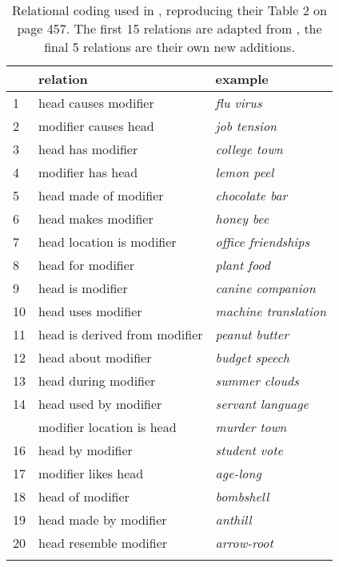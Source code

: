 \begin{table}[!htb]
  \centering
\begin{tabular}{lll}\lsptoprule
&relation&example\\\midrule
1&head causes modifier&\emph{flu virus}\\
2&modifier causes head&\emph{job tension}\\
3&head has modifier&\emph{college town}\\
4&modifier has head&\emph{lemon peel}\\
5&head made of modifier&\emph{chocolate bar}\\
6&head makes modifier&\emph{honey bee}\\
7&head location is modifier&\emph{office friendships}\\
8&head for modifier&\emph{plant food}\\
9&head is modifier&\emph{canine companion}\\
10&head uses modifier&\emph{machine translation}\\
11&head is derived from modifier&\emph{peanut butter}\\
12&head about modifier&\emph{budget speech}\\
13&head during modifier&\emph{summer clouds}\\
14&head used by modifier&\emph{servant language}\\\tablevspace
15&modifier location is head&\emph{murder town}\\
16&head by modifier&\emph{student vote}\\
17&modifier likes head&\emph{age-long}\\
18&head of modifier&\emph{bombshell}\\
19&head made by modifier&\emph{anthill}\\
20&head resemble modifier&\emph{arrow-root}\\\lspbottomrule
\end{tabular}
    \caption{Relational coding used in \citet{PhamandBaayen:2013}, reproducing their Table 2 on page 457. The first 15 relations are adapted from \citet{GagneandShoben:1997}, the final 5 relations are their own new additions.}
\label{tab:relations-in-phamandbaayen}
\end{table}


